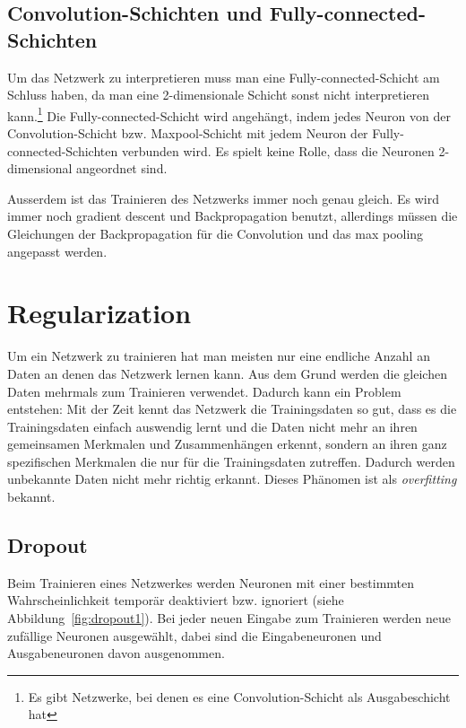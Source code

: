 \documentclass[12pt,a4paper]{report}
\begin{document}
\subsection{Convolution-Schichten und Fully-connected-Schichten}
Um das Netzwerk zu interpretieren muss man eine Fully-connected-Schicht am Schluss haben,
da man eine 2-dimensionale Schicht sonst nicht interpretieren kann.\footnote{Es gibt Netzwerke, bei denen es eine Convolution-Schicht als Ausgabeschicht hat\cite{fullconvolution}}
Die Fully-connected-Schicht wird angehängt, indem jedes Neuron von der Convolution-Schicht bzw. Maxpool-Schicht mit jedem Neuron der Fully-connected-Schichten verbunden wird.
Es spielt keine Rolle, dass die Neuronen 2-dimensional angeordnet sind.

Ausserdem ist das Trainieren des Netzwerks immer noch genau gleich.
Es wird immer noch gradient descent und Backpropagation benutzt,
allerdings müssen die Gleichungen der Backpropagation für die Convolution und das max pooling angepasst werden.

\section{Regularization}
Um ein Netzwerk zu trainieren hat man meisten nur eine endliche Anzahl an Daten an denen das Netzwerk lernen kann.
Aus dem Grund werden die gleichen Daten mehrmals zum Trainieren verwendet.
Dadurch kann ein Problem entstehen:
Mit der Zeit kennt das Netzwerk die Trainingsdaten so gut, dass es die Trainingsdaten einfach auswendig lernt
und die Daten nicht mehr an ihren gemeinsamen Merkmalen und Zusammenhängen erkennt,
sondern an ihren ganz spezifischen Merkmalen die nur für die Trainingsdaten zutreffen.
Dadurch werden unbekannte Daten nicht mehr richtig erkannt.
Dieses Phänomen ist als \textit{overfitting} bekannt.
\subsection{Dropout}
Beim Trainieren eines Netzwerkes werden Neuronen mit einer bestimmten Wahrscheinlichkeit temporär deaktiviert bzw. ignoriert (siehe Abbildung~\ref{fig:dropout1}).
Bei jeder neuen Eingabe zum Trainieren werden neue zufällige Neuronen ausgewählt,
dabei sind die Eingabeneuronen und Ausgabeneuronen davon ausgenommen.
\end{document}
